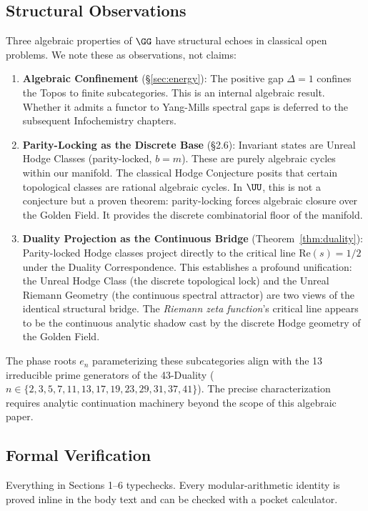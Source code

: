 \subsection{Structural Observations}

Three algebraic properties of $\GG$ have structural echoes in classical open problems. We note these as observations, not claims:

\begin{enumerate}
\item \textbf{Algebraic Confinement} (\S\ref{sec:energy}): The positive gap $\Delta = 1$ confines the Topos to finite subcategories. This is an internal algebraic result. Whether it admits a functor to Yang-Mills spectral gaps is deferred to the subsequent Infochemistry chapters.
\item \textbf{Parity-Locking as the Discrete Base} (\S2.6): Invariant states are Unreal Hodge Classes (parity-locked, $b=m$). These are purely algebraic cycles within our manifold. The classical Hodge Conjecture posits that certain topological classes are rational algebraic cycles. In $\UU$, this is not a conjecture but a proven theorem: parity-locking forces algebraic closure over the Golden Field. It provides the discrete combinatorial floor of the manifold.
\item \textbf{Duality Projection as the Continuous Bridge} (Theorem~\ref{thm:duality}): Parity-locked Hodge classes project directly to the critical line $\mathrm{Re}(s) = 1/2$ under the Duality Correspondence. This establishes a profound unification: the Unreal Hodge Class (the discrete topological lock) and the Unreal Riemann Geometry (the continuous spectral attractor) are two views of the identical structural bridge. The \emph{Riemann zeta function}'s critical line appears to be the continuous analytic shadow cast by the discrete Hodge geometry of the Golden Field.
\end{enumerate}

The phase roots $e_n$ parameterizing these subcategories align with the 13 irreducible prime generators of the 43-Duality ($n \in \{2,3,5,7,11,13,17,19,23,29,31,37,41\}$). The precise characterization requires analytic continuation machinery beyond the scope of this algebraic paper.

\subsection{Formal Verification}

Everything in Sections 1--6 typechecks. Every modular-arithmetic identity is proved inline in the body text and can be checked with a pocket calculator.

